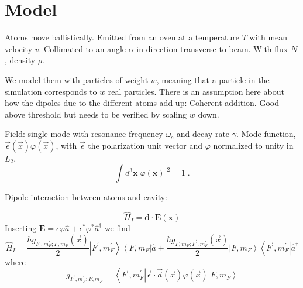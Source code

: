 \documentclass[aps, superscriptaddress, groupedaddress, preprint]{revtex4}
\begin{document}
\tableofcontents

\section{Model}

Atoms move ballistically.  Emitted from an oven at a temperature
$T$ with mean velocity $\bar{v}$.  Collimated to an angle
$\alpha$ in direction transverse to beam.  With flux $\dot N$,
density $\rho$.

We model them with particles of weight $w$, meaning that a
particle in the simulation corresponds to $w$ real particles.
There is an assumption here about how the dipoles due to the
different atoms add up: Coherent addition.  Good above threshold
but needs to be verified by scaling $w$ down.

Field: single mode with resonance frequency $\omega_c$ and decay
rate $\gamma$.  Mode function,
$\vec{\epsilon}(\vec{x})\varphi(\vec{x})$, with $\vec{\epsilon}$
the polarization unit vector and $\varphi$ normalized to unity in
$L_2$,
\begin{equation}
\int d^3\mathbf{x} \left|\varphi(\mathbf{x})\right|^2 = 1\;.
\end{equation}

Dipole interaction between atoms and cavity:

\begin{equation}
\hat H_I=\mathbf{d}\cdot\mathbf{E}(\mathbf{x})
\end{equation}
Inserting $\mathbf{E}=\epsilon\varphi\hat a +
\epsilon^*\varphi^* \hat a^\dagger$ we find
\begin{equation}
\hat H_I =
\frac{\hbar g_{ F^\prime, m_F^\prime;F, m_F}(\vec{x})}{2}
\left|F^\prime,m_F^\prime\right>\left<F, m_F\right|\hat a
+
\frac{\hbar g_{F, m_F;F^\prime, m_F^\prime}(\vec{x})}{2}
\left|F, m_F\right>\left<F^\prime,m_F^\prime\right|\hat a^\dagger
\end{equation}
where
\begin{equation}
g_{ F^\prime, m_F^\prime;F, m_F}=
\left<F^\prime,m_F^\prime\right|
\vec{\epsilon}\cdot\vec{d}(\vec{x})\varphi(\vec{x})
\left|F,m_F\right>
\end{equation}
\end{document}
